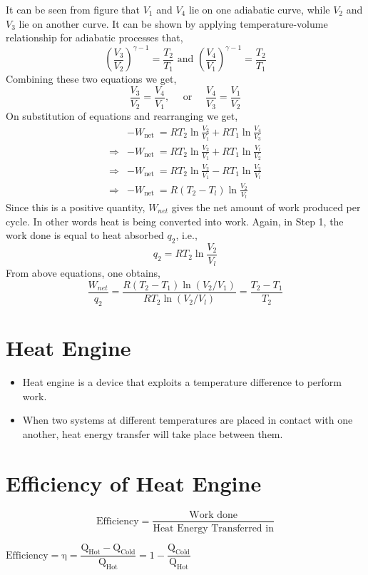 \documentclass[a4paper,12pt,twocolumn]{article}
\begin{document}
It can be seen from figure that $V_{1}$ and $V_4$ lie on one adiabatic curve, while $V_2$ and $V_3$ lie on another curve. It can be shown by applying temperature-volume relationship for adiabatic processes that,
$$
\left(\frac{V_3}{V_2}\right)^{\gamma-1}=\frac{T_2}{T_1} \text { and }\left(\frac{V_4}{V_1}\right)^{\gamma-1}=\frac{T_2}{T_1}
$$
Combining these two equations we get,
$$
\frac{V_3}{V_2}=\frac{V_4}{V_1}, \quad \text { or } \quad \frac{V_4}{V_3}=\frac{V_1}{V_2}
$$
On substitution of equations and rearranging we get,
$$
\begin{aligned}
&-W_{\text {net }}=R T_2 \ln \frac{V_2}{V_1}+R T_1 \ln \frac{V_4}{V_3} \\
\Rightarrow &-W_{\text {net }}=R T_2 \ln \frac{V_2}{V_1}+R T_1 \ln \frac{V_l}{V_2} \\
\Rightarrow &-W_{\text {net }}=R T_2 \ln \frac{V_2}{V_1}-R T_1 \ln \frac{V_2}{V_l} \\
\Rightarrow &-W_{\text {net }}=R\left(T_2-T_l\right) \ln \frac{V_2}{V_l}
\end{aligned}
$$
Since this is a positive quantity, $W_{net}$ gives the net amount of work produced per cycle. In other words heat is being converted into work.
Again, in Step 1, the work done is equal to heat absorbed $q_2$, i.e.,
$$
q_2=R T_2 \ln \frac{V_2}{V_l}
$$
From above equations, one obtains,
$$
\frac{W_{n e t}}{q_2}=\frac{R\left(T_2-T_1\right) \ln \left(V_2 / V_1\right)}{R T_2 \ln \left(V_2 / V_l\right)}=\frac{T_2-T_1}{T_2}
$$


\section{Heat Engine}
\begin{itemize}
\item Heat engine is a device that exploits a temperature difference to perform work. 
\item When two systems at different temperatures are placed in contact with one another, heat energy transfer will take place between them. 
\end{itemize}

\section{Efficiency of Heat Engine}
$$\text{Efficiency} = \dfrac{\text{Work done}}{\text{Heat Energy Transferred in}}$$
\begin{Box1}{}
$\text{Efficiency} = \mathrm{\eta} = \dfrac{\mathrm{Q_{Hot} - Q_{Cold}}}{\mathrm{Q_{Hot}}} = 1 -\dfrac{\mathrm{Q_{Cold}}}{\mathrm{Q_{Hot}}}$
\end{Box1}
\end{document}
